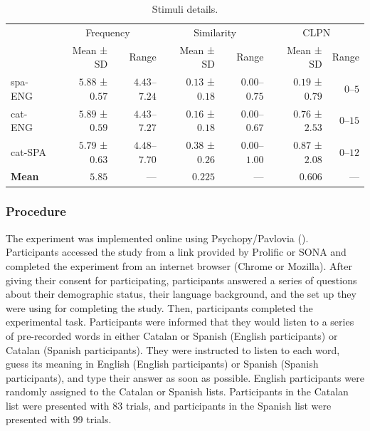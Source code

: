 \documentclass[
]{article}
\begin{document}
\begin{longtable}{l|rrrrrr}

\caption{\label{tbl-stimuli}Stimuli details.}

\tabularnewline

\toprule
\multicolumn{1}{l}{} & \multicolumn{2}{c}{Frequency} & \multicolumn{2}{c}{Similarity} & \multicolumn{2}{c}{CLPN} \\ 
\cmidrule(lr){2-3} \cmidrule(lr){4-5} \cmidrule(lr){6-7}
\multicolumn{1}{l}{} & Mean ± SD & Range & Mean ± SD & Range & Mean ± SD & Range \\ 
\midrule\addlinespace[2.5pt]
spa-ENG & $5.88$ ± $0.57$ & $4.43$–$7.24$ & $0.13$ ± $0.18$ & $0.00$–$0.75$ & $0.19$ ± $0.79$ & $0$–$5$ \\ 
cat-ENG & $5.89$ ± $0.59$ & $4.43$–$7.27$ & $0.16$ ± $0.18$ & $0.00$–$0.67$ & $0.76$ ± $2.53$ & $0$–$15$ \\ 
cat-SPA & $5.79$ ± $0.63$ & $4.48$–$7.70$ & $0.38$ ± $0.26$ & $0.00$–$1.00$ & $0.87$ ± $2.08$ & $0$–$12$ \\ 
\midrule 
\midrule 
\textbf{Mean} & $5.85$ & — & $0.225$ & — & $0.606$ & — \\ 
\bottomrule

\end{longtable}

\subsubsection{Procedure}\label{procedure}

The experiment was implemented online using Psychopy/Pavlovia
(). Participants
accessed the study from a link provided by Prolific or SONA and
completed the experiment from an internet browser (Chrome or Mozilla).
After giving their consent for participating, participants answered a
series of questions about their demographic status, their language
background, and the set up they were using for completing the study.
Then, participants completed the experimental task. Participants were
informed that they would listen to a series of pre-recorded words in
either Catalan or Spanish (English participants) or Catalan (Spanish
participants). They were instructed to listen to each word, guess its
meaning in English (English participants) or Spanish (Spanish
participants), and type their answer as soon as possible. English
participants were randomly assigned to the Catalan or Spanish lists.
Participants in the Catalan list were presented with 83 trials, and
participants in the Spanish list were presented with 99 trials.
\end{document}
